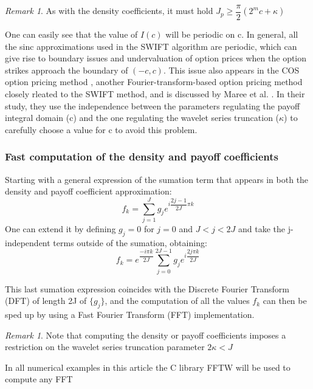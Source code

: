 \documentclass[12,twoside]{mammeTFM}
\theoremstyle{definition}
\theoremstyle{remark}
\newtheorem{remark}[thm]{Remark}
\begin{document}
\begin{remark}
As with the density coefficients, it must hold $J_p \geq \dfrac{\pi}{2}(2^m c + \kappa)$
\end{remark}

One can easily see that the value of $I(c)$ will be periodic on c. In general, all the sinc approximations used in the SWIFT algorithm are periodic, which can give rise to boundary issues and undervaluation of option prices when the option strikes approach the boundary of $(-c, c)$. This issue also appears in the COS option pricing method \cite{Fang2008}, another Fourier-transform-based option pricing method closely rleated to the SWIFT method, and is discussed by Maree et al. \cite{mar17}. In their study, they use the independence between the parameters regulating the payoff integral domain (c) and the one regulating the wavelet series truncation ($\kappa$) to carefully choose a value for c to avoid this problem.

\subsubsection{Fast computation of the density and payoff coefficients} \label{subsec:fft}
Starting with a general expression of the sumation term that appears in both the density and payoff coefficient approximation:
\begin{equation}
f_k = \sum_{j=1}^J g_j e^{i \dfrac{2j - 1}{2J}\pi k}
\end{equation}
One can extend it by defining $g_j = 0$ for $j = 0$ and $J < j < 2J$ and take the j-independent terms outside of the sumation, obtaining:
\begin{equation}
f_k = e^{\dfrac{-i \pi k}{2J}}\sum_{j=0}^{2J - 1} g_j e^{i \dfrac{2j\pi k}{2J}}
\end{equation}

This last sumation expression coincides with the Discrete Fourier Transform (DFT) of length 2J of $\{g_j\}$, and the computation of all the values $f_k$ can then be sped up by using a Fast Fourier Transform (FFT) implementation. 

\begin{remark}
Note that computing the density or payoff coefficients imposes a restriction on the wavelet series truncation parameter $2 \kappa < J$
\end{remark}

In all numerical examples in this article the C library FFTW will be used to compute any FFT \cite{fftw3}
\end{document}
